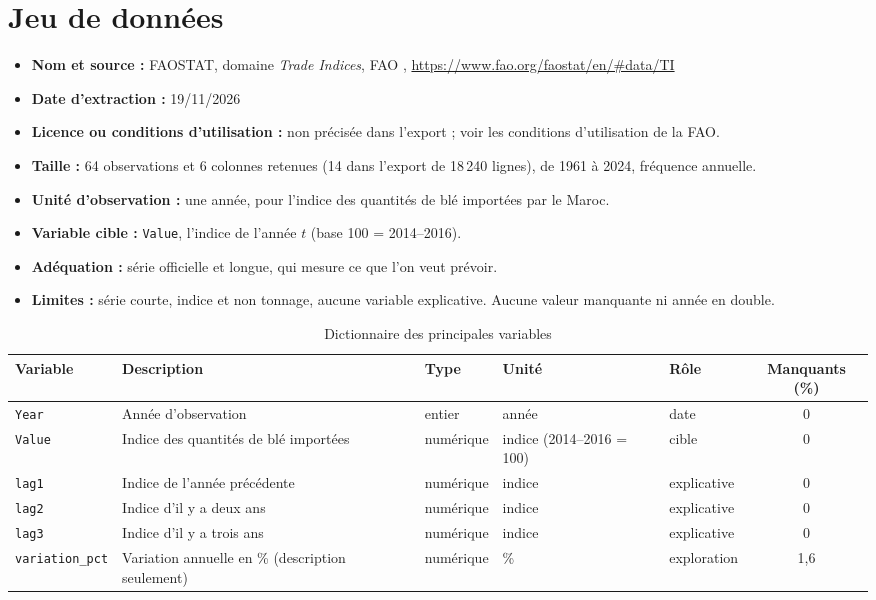 \documentclass[11pt,a4paper]{article}
\begin{document}
\section{Jeu de données}
\label{sec:donnees}
\begin{itemize}
  \item \textbf{Nom et source :} FAOSTAT, domaine \emph{Trade Indices}, FAO \cite{donnees}, \url{https://www.fao.org/faostat/en/#data/TI}
  \item \textbf{Date d'extraction :} 19/11/2026
  \item \textbf{Licence ou conditions d'utilisation :} non précisée dans l'export ; voir les conditions d'utilisation de la FAO.
  \item \textbf{Taille :} 64 observations et 6 colonnes retenues (14 dans l'export de 18\,240 lignes), de 1961 à 2024, fréquence annuelle.
  \item \textbf{Unité d'observation :} une année, pour l'indice des quantités de blé importées par le Maroc.
  \item \textbf{Variable cible :} \texttt{Value}, l'indice de l'année $t$ (base 100 = 2014--2016).
  \item \textbf{Adéquation :} série officielle et longue, qui mesure ce que l'on veut prévoir.
  \item \textbf{Limites :} série courte, indice et non tonnage, aucune variable explicative. Aucune valeur manquante ni année en double.
\end{itemize}

\begin{table}[htbp]
  \centering
  \caption{Dictionnaire des principales variables}
  \label{tab:dictionnaire}
  \small
  \begin{tabular}{@{}l P{4.4cm} l P{2.6cm} l c@{}}
    \toprule
    Variable & Description & Type & Unité & Rôle & Manquants (\%) \\
    \midrule
    \texttt{Year} & Année d'observation & entier & année & date & 0 \\
    \texttt{Value} & Indice des quantités de blé importées & numérique & indice (2014--2016 = 100) & cible & 0 \\
    \texttt{lag1} & Indice de l'année précédente & numérique & indice & explicative & 0 \\
    \texttt{lag2} & Indice d'il y a deux ans & numérique & indice & explicative & 0 \\
    \texttt{lag3} & Indice d'il y a trois ans & numérique & indice & explicative & 0 \\
    \texttt{variation\_pct} & Variation annuelle en \% (description seulement) & numérique & \% & exploration & 1,6 \\
    \bottomrule
  \end{tabular}
\end{table}
\end{document}
